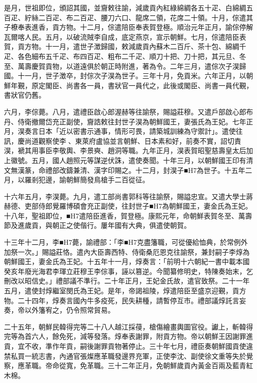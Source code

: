 \begin{pinyinscope}
是月，世祖即位，頒詔其國，並齎敕往諭，減歲貢內紅綠綿綢各五十疋、白綿綢五百疋、紵絲二百疋、布二百疋、腰刀六口、龍席二領，花席二十領。十月，倧遣其子橑奉表進香，貢方物。十二月，倧遣陪臣奉表賀登極。順治元年正月，諭倧停解瓦爾喀人民。五月，以破流賊李自成，底定燕京，宣示朝鮮。七月，倧遣陪臣表賀，貢方物。十一月，遣世子澂歸國，敕減歲貢內蘇木二百斤、茶十包、綿綢千疋、各色細布五千疋、布四百疋、粗布二千疋、順刀十把、刀十把，其元旦、冬至、萬壽慶賀貢物，以道遠俱於朝正時附進，著為令。二年三月，遣倧次子淏歸國。十一月，世子澂卒，封倧次子淏為世子。三年十月，免貢米。六年正月，以朝鮮年覲，原定閣臣、尚書各一員，書狀官一員代之，此後或閣臣、尚書一員代覲，書狀官仍舊。

六月，李倧薨。八月，遣禮臣啟心郎渥赫等往諭祭，賜謚莊穆。又遣戶部啟心郎布丹、侍衛撤爾岱充正副使，齎誥敕往封世子淏為朝鮮國王，妻張氏為王妃。七年正月，淏奏言日本「近以密書示通事，情形可畏，請築城訓練為守禦計」。遣使往訊，慶尚道觀察使李、東萊府盧協並言朝鮮、日本素和好，前奏不實，詔切責淏，褫其用事臣李敬輿、李景奭、趙洞等職。九年正月，淏表賀昭聖慈壽皇太后加上徽號。五月，國人趙照元等謀逆伏誅，遣使奏聞。十年三月，以朝鮮國王印有清文無漢篆，命禮部改鑄兼清、漢字印賜之。十二月，封淏子■H7為世子。十五年二月，以羅剎犯邊，諭朝鮮簡發鳥槍手二百從征。

十六年五月，李淏薨。九月，遣工部尚書郭科等往諭祭，賜謚忠宣。又遣大學士蔣赫德、吏部侍郎覺羅博碩會充正副使，往封世子■H7為朝鮮國王，妻金氏為王妃。十八年，聖祖即位，■H7遣陪臣進香，賀登極。康熙元年，命朝鮮表賀冬至、萬壽節及進歲貢，與朝正之使偕行。屢年國有大典，俱遣使朝賀。

十三年十二月，李■H7薨，諭禮部：「李■H7克盡籓職，可從優給恤典，於常例外加祭一次。」賜謚莊恪。遣內大臣壽西特、侍衛桑厄恩克往諭祭，兼封嗣子李焞為朝鮮國王，妻金氏為王妃。十五年十一月，焞奏言：「前明十六朝紀一書中載本國癸亥年廢光海君李琿立莊穆王李倧事，誣以篡逆。今聞纂修明史，特陳奏始末，乞刪改以昭信史。」禮部議不準行。二十年正月，王妃金氏故，遣官致祭。二十一年五月，遣使封焞繼室閔氏為王妃。是年，帝謁祖陵，焞遣陪臣至盛京迎覲，貢方物。二十四年，焞奏言國內牛多疫死，民失耕種，請暫停互市。禮部議焞託言妄奏，帝以外籓宥之，仍令照常貿易。

二十五年，朝鮮民韓得完等二十八人越江採葠，槍傷繪畫輿圖官役。讞上，斬韓得完等為首六人，餘免死，減等發落。焞奉表謝罪，附貢方物。帝以朝鮮王因謝罪進貢，宜不收，準作年貢，嗣後謝罪貢物著停止。三十年七月，禮臣奏朝鮮國貢使違禁私買一統志書，內通官張燦應革職發邊界充軍，正使李沈、副使徐文重等失於覺察，應革職。帝命從寬，免革職。三十二年正月，免朝鮮歲貢內黃金百兩及藍青紅木棉。


\end{pinyinscope}
